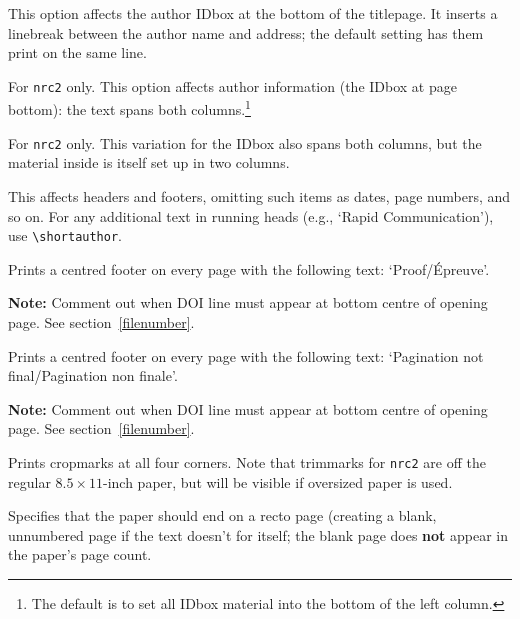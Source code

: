 \begin{description} \itemsep=0pt
   \item [{\tt breakaddress}] 
%
         This option affects the author IDbox at the bottom of the
         titlepage. It inserts a linebreak between the author name and
         address; the default setting has them print on the same line.

   \item [{\tt twocolid}] 
%
         For \texttt{nrc2} only. This option affects author
         information (the IDbox at page bottom): the text spans both
         columns.\footnote{The default is to set all IDbox material
         into the bottom of the left column.}

   \item [{\tt twocolid*}] 
%
         For \texttt{nrc2} only. This variation for the IDbox also
         spans both columns, but the material inside is itself set up
         in two columns.

   \item [{\tt preprint}] 
%
         This affects headers and footers, omitting such items as
         dates, page numbers, and so on. For any additional text in
         running heads (e.g., `Rapid Communication'), use
         \verb|\shortauthor|.

   \item [{\tt proof}] 
%
         Prints a centred footer on every page with the following
         text: `Proof/\'Epreuve'.\label{proof-pagnf}

        {\bf Note:} Comment out when {\small DOI} line must appear at
        bottom centre of opening page. See section~\ref{filenumber}.


   \item [{\tt pagnf}] 
%
         Prints a centred footer on every page with the following
         text: `Pagination not final/Pagination non
         finale'.

        {\bf Note:} Comment out when {\small DOI} line must appear at
        bottom centre of opening page. See section~\ref{filenumber}.


   \item [{\tt trimmarks}] 
%
         Prints cropmarks at all four corners. Note that trimmarks for
         \texttt{nrc2} are off the regular $8.5 \times 11$-inch paper,
         but will be visible if oversized paper is used.


   \item [{\tt finalverso}] 
%
         Specifies that the paper should end on a recto page (creating
         a blank, unnumbered page if the text doesn't for itself; the
         blank page does {\bf not} appear in the paper's page count.

\end{description}


